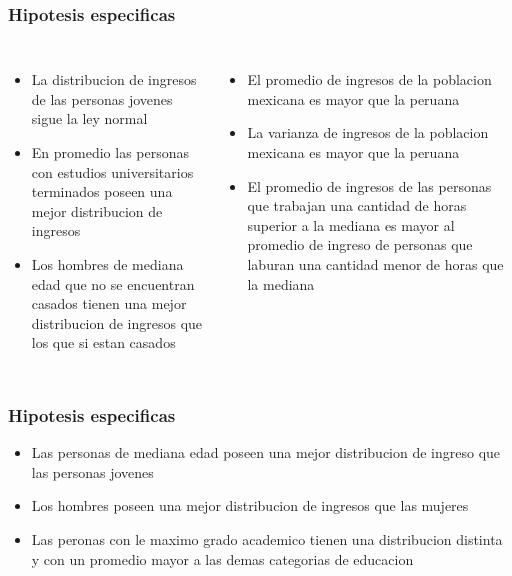 \documentclass{beamer}
\begin{document}
\begin{frame}
\frametitle{Hipotesis especificas}

\begin{columns}

\begin{itemize}
    \item La distribucion de ingresos de las personas jovenes sigue
      la ley normal
    \item En \alert{promedio} las personas con
      estudios universitarios terminados poseen una mejor distribucion
      de ingresos
    \item Los hombres de mediana edad que no se encuentran casados
      tienen una mejor distribucion de ingresos que los que si estan casados
\end{itemize}


\begin{itemize}
    \item El promedio de ingresos de la poblacion mexicana es mayor
      que la peruana
    \item La varianza de ingresos de la poblacion mexicana es mayor
      que la peruana
    \item El \alert{promedio de ingresos} de las personas que trabajan
      una cantidad de horas superior a la mediana es mayor al promedio
      de ingreso de personas que laburan una cantidad menor de horas
      que la mediana
\end{itemize}
\end{columns}
\end{frame}


\begin{frame}
\frametitle{Hipotesis especificas}
\begin{itemize}
    \item Las personas de mediana edad poseen una mejor distribucion
      de ingreso que las personas jovenes
    \item Los hombres poseen una mejor distribucion de ingresos
      que las mujeres
    \item Las peronas con le maximo grado academico tienen una distribucion
      distinta y con un promedio mayor a las demas categorias de educacion
\end{itemize}

\end{frame}
\end{document}
